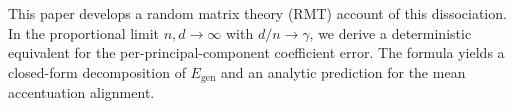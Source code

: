 \documentclass{article}
\theoremstyle{plain}
\theoremstyle{definition}
\theoremstyle{remark}
\begin{document}
This paper develops a random matrix theory (RMT) account of this dissociation. In the proportional limit $n,d\to\infty$ with $d/n\to\gamma$, we derive a deterministic equivalent for the per-principal-component coefficient error. The formula yields a closed-form decomposition of $E_{\mathrm{gen}}$ and an analytic prediction for the mean accentuation alignment.

\fi 








\begin{figure}
    \centering

\end{figure}
\end{document}

